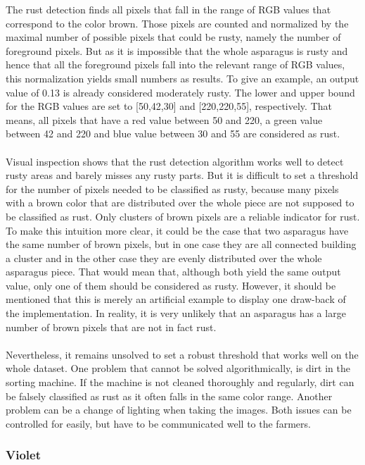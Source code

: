 The rust detection finds all pixels that fall in the range of RGB values that correspond to the color brown. Those pixels are counted and normalized by the maximal number of possible pixels that could be rusty, namely the number of foreground pixels. But as it is impossible that the whole asparagus is rusty and hence that all the foreground pixels fall into the relevant range of RGB values, this normalization yields small numbers as results. To give an example, an output value of 0.13 is already considered moderately rusty. The lower and upper bound for the RGB values are set to [50,42,30] and [220,220,55], respectively. That means, all pixels that have a red value between 50 and 220, a green value between 42 and 220 and blue value between 30 and 55 are considered as rust. \\
\\
Visual inspection shows that the rust detection algorithm works well to detect rusty areas and barely misses any rusty parts. But it is difficult to set a threshold for the number of pixels needed to be classified as rusty, because many pixels with a brown color that are distributed over the whole piece are not supposed to be classified as rust. Only clusters of brown pixels are a reliable indicator for rust. To make this intuition more clear, it could be the case that two asparagus have the same number of brown pixels, but in one case they are all connected building a cluster and in the other case they are evenly distributed over the whole asparagus piece. That would mean that, although both yield the same output value, only one of them should be considered as rusty. However, it should be mentioned that this is merely an artificial example to display one draw-back of the implementation. In reality, it is  very unlikely that an asparagus has a large number of brown pixels that are not in fact rust. \\
\\
Nevertheless, it remains unsolved to set a robust threshold that works well on the whole dataset. One problem that cannot be solved algorithmically, is dirt in the sorting machine. If the machine is not cleaned thoroughly and regularly, dirt can be falsely classified as rust as it often falls in the same color range. Another problem can be a change of lighting when taking the images. Both issues can be controlled for easily, but have to be communicated well to the farmers.

\subsubsection{Violet}

